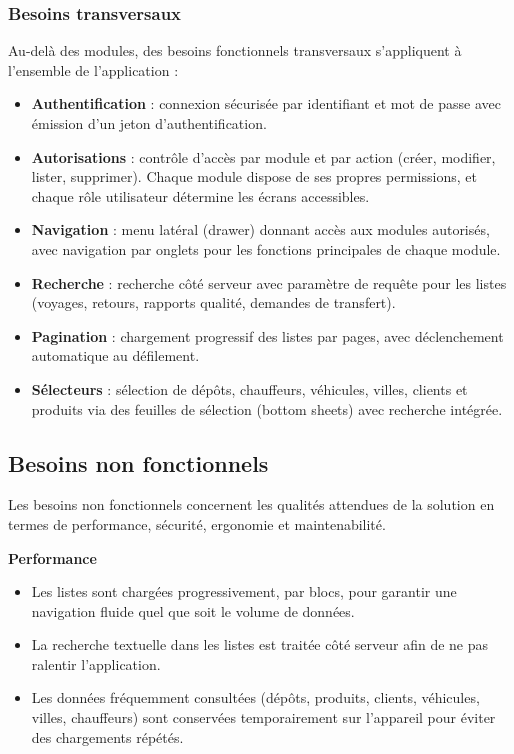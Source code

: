 \documentclass[12pt,a4paper]{article}
\begin{document}
    \subsubsection{Besoins transversaux}
    Au-delà des modules, des besoins fonctionnels transversaux s'appliquent à l'ensemble de l'application :
    \begin{itemize}[leftmargin=1.2em]
    \item \textbf{Authentification} : connexion sécurisée par identifiant et mot de passe avec émission d'un jeton d'authentification.
    \item \textbf{Autorisations} : contrôle d'accès par module et par action (créer, modifier, lister, supprimer). Chaque module dispose de ses propres permissions, et chaque rôle utilisateur détermine les écrans accessibles.
    \item \textbf{Navigation} : menu latéral (drawer) donnant accès aux modules autorisés, avec navigation par onglets pour les fonctions principales de chaque module.
    \item \textbf{Recherche} : recherche côté serveur avec paramètre de requête pour les listes (voyages, retours, rapports qualité, demandes de transfert).
    \item \textbf{Pagination} : chargement progressif des listes par pages, avec déclenchement automatique au défilement.
    \item \textbf{Sélecteurs} : sélection de dépôts, chauffeurs, véhicules, villes, clients et produits via des feuilles de sélection (bottom sheets) avec recherche intégrée.
    \end{itemize}

    \subsection{Besoins non fonctionnels}
    Les besoins non fonctionnels concernent les qualités attendues de la solution en termes de performance, sécurité, ergonomie et maintenabilité.

    \vspace{0.8em}\textbf{Performance}\vspace{0.2em}
    \begin{itemize}[leftmargin=1.2em,topsep=0pt]
    \item Les listes sont chargées progressivement, par blocs, pour garantir une navigation fluide quel que soit le volume de données.
    \item La recherche textuelle dans les listes est traitée côté serveur afin de ne pas ralentir l'application.
    \item Les données fréquemment consultées (dépôts, produits, clients, véhicules, villes, chauffeurs) sont conservées temporairement sur l'appareil pour éviter des chargements répétés.
    \end{itemize}
\end{document}
